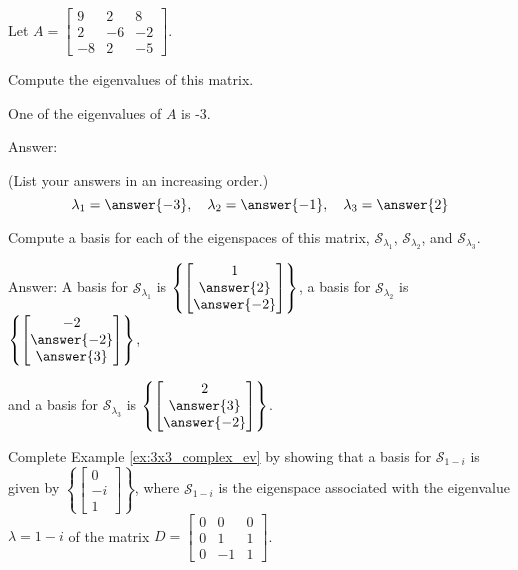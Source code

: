 \documentclass{ximera}
\begin{document}
\begin{problem}\label{prob:3x3 from Kuttler}
Let $A=\begin{bmatrix} 9 & 2 & 8\\ 2 & -6 & -2\\ -8 & 2 & -5\end{bmatrix}$.  
\begin{problem}
Compute the eigenvalues of this matrix. 
\begin{hint}
One of the eigenvalues of $A$ is -3.
\end{hint}

Answer:

(List your answers in an increasing order.)
$$\lambda_1 = \answer{-3},\quad \lambda_2 = \answer{-1},\quad \lambda_3 = \answer{2}$$
\end{problem}
\begin{problem}
Compute a basis for each of the eigenspaces of this matrix,  $\mathcal{S}_{\lambda_1}$, $\mathcal{S}_{\lambda_2}$, and $\mathcal{S}_{\lambda_3}$.

Answer:
A basis for $\mathcal{S}_{\lambda_1}$ is $\left\{\begin{bmatrix}1\\\answer{2}\\\answer{-2}\end{bmatrix}\right\}$, 
a basis for $\mathcal{S}_{\lambda_2}$ is $\left\{\begin{bmatrix}-2\\\answer{-2}\\\answer{3}\end{bmatrix}\right\}$,

and a basis for $\mathcal{S}_{\lambda_3}$ is $\left\{\begin{bmatrix}2\\\answer{3}\\\answer{-2}\end{bmatrix}\right\}$.
\end{problem}
\end{problem}

\begin{problem}\label{prob:3x3_complex_ev}
Complete Example \ref{ex:3x3_complex_ev} by showing that a basis for $\mathcal{S}_{1-i}$ is given by $\left\{\begin{bmatrix}0\\-i\\1\end{bmatrix}\right\}$, where  $\mathcal{S}_{1-i}$ is the eigenspace associated with the eigenvalue $\lambda=1-i$ of the matrix $D=\begin{bmatrix} 0&0&0\\ 0 &1&1\\ 0 & -1&1\end{bmatrix}$.
\end{problem}
\end{document}
